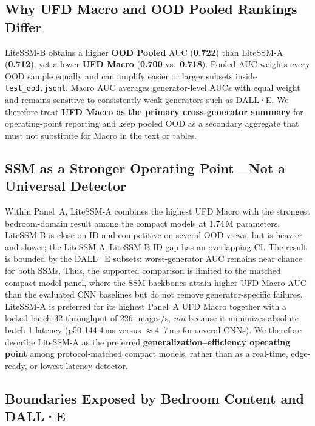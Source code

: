 \subsection{Why UFD Macro and OOD Pooled Rankings Differ}

LiteSSM-B obtains a higher \textbf{OOD Pooled} AUC (\textbf{0.722}) than LiteSSM-A (\textbf{0.712}), yet a lower \textbf{UFD Macro} (\textbf{0.700} vs.\ \textbf{0.718}).
Pooled AUC weights every OOD sample equally and can amplify easier or larger subsets inside \texttt{test\_ood.jsonl}.
Macro AUC averages generator-level AUCs with equal weight and remains sensitive to consistently weak generators such as DALL·E.
We therefore treat \textbf{UFD Macro as the primary cross-generator summary} for operating-point reporting and keep pooled OOD as a secondary aggregate that must not substitute for Macro in the text or tables.

\subsection{SSM as a Stronger Operating Point---Not a Universal Detector}

Within Panel~A, LiteSSM-A combines the highest UFD Macro with the strongest bedroom-domain result among the compact models at 1.74\,M parameters.
LiteSSM-B is close on ID and competitive on several OOD views, but is heavier and slower; the LiteSSM-A--LiteSSM-B ID gap has an overlapping CI.
The result is bounded by the DALL·E subsets: worst-generator AUC remains near chance for both SSMs.
Thus, the supported comparison is limited to the matched compact-model panel, where the SSM backbones attain higher UFD Macro AUC than the evaluated CNN baselines but do not remove generator-specific failures.
LiteSSM-A is preferred for its highest Panel~A UFD Macro together with a locked batch-32 throughput of 226 images/s, \emph{not} because it minimizes absolute batch-1 latency (p50 144.4\,ms versus $\approx$4--7\,ms for several CNNs).
We therefore describe LiteSSM-A as the preferred \textbf{generalization--efficiency operating point} among protocol-matched compact models, rather than as a real-time, edge-ready, or lowest-latency detector.

\subsection{Boundaries Exposed by Bedroom Content and DALL·E}

